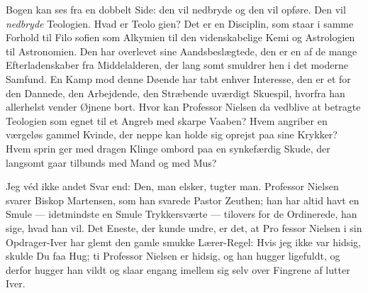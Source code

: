 \documentclass[12pt,a4paper,openany]{book}
\newcommand{\opage}[1]{\marginnote{\footnotesize\textit{[#1]}}}
\begin{document}
Bogen kan ses fra en dobbelt Side: den vil nedbryde og
den vil opføre. Den vil \emph{nedbryde} Teologien. Hvad er Teolo%
\opage{86}gien? Det er en Disciplin, som staar i samme Forhold til Filo\-%
sofien som Alkymien til den videnskabelige Kemi og Astrologien
til Astronomien. Den har overlevet sine Aandsbeslægtede, den
er en af de mange Efterladenskaber fra Middelalderen, der lang\-%
somt smuldrer hen i det moderne Samfund. En Kamp mod denne
Døende har tabt enhver Interesse, den er et for den Dannede,
den Arbejdende, den Stræbende uværdigt Skuespil, hvorfra han
allerhelst vender Øjnene bort. Hvor kan Professor Nielsen da
vedblive at betragte Teologien som egnet til et Angreb med
skarpe Vaaben? Hvem angriber en værgeløs gammel Kvinde,
der neppe kan holde sig oprejst paa sine Krykker? Hvem sprin\-%
ger med dragen Klinge ombord paa en synkefærdig Skude, der
langsomt gaar tilbunds med Mand og med Mus?

Jeg véd ikke andet Svar end: Den, man elsker, tugter man.
Professor Nielsen svarer Biskop Martensen, som han svarede
Pastor Zeuthen; han har altid havt en Smule --- idetmindste en
Smule Trykkersværte --- tilovers for de Ordinerede, han sige,
hvad han vil. Det Eneste, der kunde undre, er det, at Pro\-%
fessor Nielsen i sin Opdrager-Iver har glemt den gamle smukke
Lærer-Regel: Hvis jeg ikke var hidsig, skulde Du faa Hug; ti
Professor Nielsen er hidsig, og han hugger ligefuldt, og derfor
hugger han vildt og slaar engang imellem sig selv over Fingrene
af lutter Iver.
\end{document}
